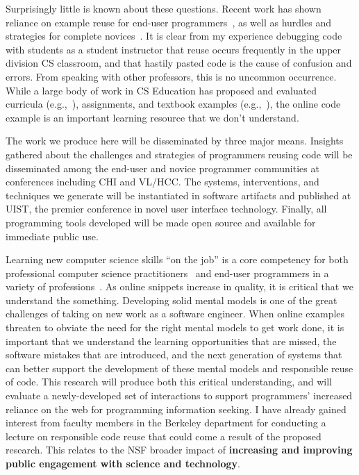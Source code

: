 \documentclass[12pt]{memoir}
\begin{document}

Surprisingly little is known about these questions.
Recent work has shown reliance on example reuse for end-user programmers~\cite{brandt_two_2009}, as well as hurdles and strategies for complete novices~\cite{ichinco_exploring_2015}.
It is clear from my experience debugging code with students as a student instructor that reuse occurs frequently in the upper division CS classroom, and that hastily pasted code is the cause of confusion and errors.
From speaking with other professors, this is no uncommon occurrence.
While a large body of work in CS Education has proposed and evaluated curricula (e.g.,~\cite{tew_developing_2010}), assignments, and textbook examples (e.g.,~\cite{borstler_quality_2011}), the online code example is an important learning resource that we don't understand.

The work we produce here will be disseminated by three major means.
Insights gathered about the challenges and strategies of programmers reusing code will be disseminated among the end-user and novice programmer communities at conferences including CHI and VL/HCC\@.
The systems, interventions, and techniques we generate will be instantiated in software artifacts and published at UIST, the premier conference in novel user interface technology.
Finally, all programming tools developed will be made open source and available for immediate public use.


Learning new computer science skills ``on the job'' is a core competency for both professional computer science practitioners~\cite{exter_exploring_2012} and end-user programmers in a variety of professions~\cite{dorn_learning_2010}.
As online snippets increase in quality, it is critical that we understand the something.
Developing solid mental models is one of the great challenges of taking on new work as a software engineer.
When online examples threaten to obviate the need for the right mental models to get work done, it is important that we understand the learning opportunities that are missed, the software mistakes that are introduced, and the next generation of systems that can better support the development of these mental models and responsible reuse of code.
This research will produce both this critical understanding, and will evaluate a newly-developed set of interactions to support programmers' increased reliance on the web for programming information seeking.
I have already gained interest from faculty members in the Berkeley department for conducting a lecture on responsible code reuse that could come a result of the proposed research.
This relates to the NSF broader impact of \textbf{increasing and improving public engagement with science and technology}.
\end{document}

